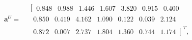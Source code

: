 \documentclass{article}
\begin{document}
\begin{equation}\label{U7}
\mathbf{a}^U =
\!\begin{aligned}
&
\left[\begin{matrix}
  0.848 & 0.988 & 1.446 & 1.607 & 3.820  & 0.915 & 0.400
\end{matrix}\right.\\[-2pt]
&\ 
\left.\begin{matrix}
  0.850 & 0.419 & 4.162 & 1.090  & 0.122 & 0.039 & 2.124
\end{matrix}\right.\\[-4pt]
&\ 
\left.\begin{matrix}
  0.872 & 0.007 & 2.737 & 1.804 & 1.360  & 0.744 & 1.174
\end{matrix}\right]^T,
\end{aligned}
\end{equation}
\end{document}
